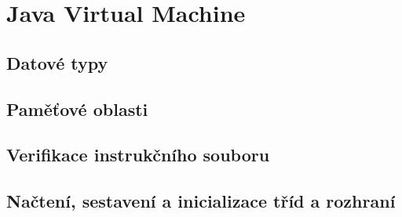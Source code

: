 \chapter{Java Virtual Machine}


\section{Datové typy}


\section{Paměťové oblasti}


\section{Verifikace instrukčního souboru}


\section{Načtení, sestavení a inicializace tříd a rozhraní}



